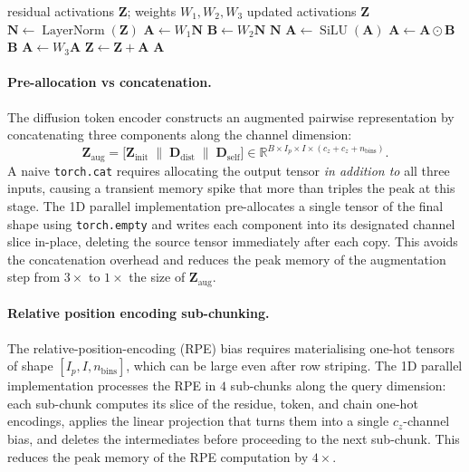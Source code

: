 \documentclass{article}
\theoremstyle{plain}
\theoremstyle{definition}
\theoremstyle{remark}
\begin{document}
\begin{algorithm}[tb]
  \caption{Manual SwiGLU decomposition (memory-friendly inference implementation).}
  \label{alg:swiglu-decomp}
  \begin{algorithmic}
     residual activations $\mathbf{Z}$; weights $W_1, W_2, W_3$
     updated activations $\mathbf{Z}$
    \STATE $\mathbf{N} \gets \operatorname{LayerNorm}(\mathbf{Z})$
    \STATE $\mathbf{A} \gets W_1\mathbf{N}$
    \STATE $\mathbf{B} \gets W_2\mathbf{N}$
     $\mathbf{N}$
    \STATE $\mathbf{A} \gets \operatorname{SiLU}(\mathbf{A})$
    \STATE $\mathbf{A} \gets \mathbf{A} \odot \mathbf{B}$
     $\mathbf{B}$
    \STATE $\mathbf{A} \gets W_3\mathbf{A}$
    \STATE $\mathbf{Z} \gets \mathbf{Z} + \mathbf{A}$
     $\mathbf{A}$
  \end{algorithmic}
\end{algorithm}

\paragraph{Pre-allocation vs concatenation.}
\label{app:prealloc}
The diffusion token encoder constructs an augmented pairwise representation by concatenating three components along the channel dimension:
\begin{equation}
\mathbf{Z}_\text{aug} = \bigl[\mathbf{Z}_\text{init} \;\|\;
  \mathbf{D}_\text{dist} \;\|\; \mathbf{D}_\text{self}\bigr]
  \in \mathbb{R}^{B \times I_p \times I
    \times (c_z + c_z + n_\text{bins})}.
\end{equation}
A naive \texttt{torch.cat} requires allocating the output tensor \emph{in addition to} all three inputs, causing a transient memory spike that more than triples the peak at this stage. The 1D parallel implementation pre-allocates a single tensor of the final shape using \texttt{torch.empty} and writes each component into its designated channel slice in-place, deleting the source tensor immediately after each copy. This avoids the concatenation overhead and reduces the peak memory of the augmentation step from $3\times$ to $1\times$ the size of $\mathbf{Z}_\text{aug}$.

\paragraph{Relative position encoding sub-chunking.}
The relative-position-encoding (RPE) bias requires materialising one-hot tensors of shape $[I_p, I, n_\text{bins}]$, which can be large even after row striping. The 1D parallel implementation processes the RPE in $4$ sub-chunks along the query dimension: each sub-chunk computes its slice of the residue, token, and chain one-hot encodings, applies the linear projection that turns them into a single $c_z$-channel bias, and deletes the intermediates before proceeding to the next sub-chunk. This reduces the peak memory of the RPE computation by $4\times$.
\end{document}
